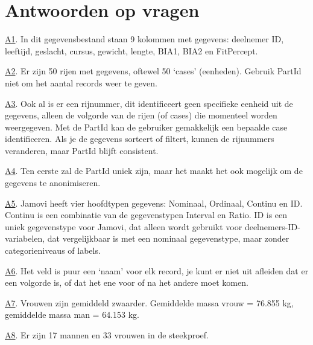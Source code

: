 \documentclass[
  letterpaper,
  DIV=11,
  numbers=noendperiod]{scrartcl}
\begin{document}
\hypertarget{antwoorden-op-vragen}{%
\section{Antwoorden op vragen}\label{antwoorden-op-vragen}}

\begin{tcolorbox}[beforeafter skip=1cm, ignore nobreak=true, breakable, colframe=Questions-frame, colback=Questions-bg, coltext=Questions-text, boxsep=2mm, arc=0mm, boxrule=0.5mm]

\protect\hypertarget{A1}{\protect\hyperlink{Q1}{A1}}. In dit
gegevensbestand staan 9 kolommen met gegevens: deelnemer ID, leeftijd,
geslacht, cursus, gewicht, lengte, BIA1, BIA2 en FitPercept.

\protect\hypertarget{A2}{\protect\hyperlink{Q2}{A2}}. Er zijn 50 rijen
met gegevens, oftewel 50 `cases' (eenheden). Gebruik PartId niet om het
aantal records weer te geven.

\protect\hypertarget{A3}{\protect\hyperlink{Q3}{A3}}. Ook al is er een
rijnummer, dit identificeert geen specifieke eenheid uit de gegevens,
alleen de volgorde van de rijen (of cases) die momenteel worden
weergegeven. Met de PartId kan de gebruiker gemakkelijk een bepaalde
case identificeren. Als je de gegevens sorteert of filtert, kunnen de
rijnummers veranderen, maar PartId blijft consistent.

\protect\hypertarget{A4}{\protect\hyperlink{Q4}{A4}}. Ten eerste zal de
PartId uniek zijn, maar het maakt het ook mogelijk om de gegevens te
anonimiseren.

\protect\hypertarget{A5}{\protect\hyperlink{Q5}{A5}}. Jamovi heeft vier
hoofdtypen gegevens: Nominaal, Ordinaal, Continu en ID. Continu is een
combinatie van de gegevenstypen Interval en Ratio. ID is een uniek
gegevenstype voor Jamovi, dat alleen wordt gebruikt voor
deelnemers-ID-variabelen, dat vergelijkbaar is met een nominaal
gegevenstype, maar zonder categorieniveaus of labels.

\protect\hypertarget{A6}{\protect\hyperlink{Q6}{A6}}. Het veld is puur
een `naam' voor elk record, je kunt er niet uit afleiden dat er een
volgorde is, of dat het ene voor of na het andere moet komen.

\protect\hypertarget{A7}{\protect\hyperlink{Q7}{A7}}. Vrouwen zijn
gemiddeld zwaarder. Gemiddelde massa vrouw = 76.855 kg, gemiddelde massa
man = 64.153 kg.

\protect\hypertarget{A8}{\protect\hyperlink{Q8}{A8}}. Er zijn 17 mannen
en 33 vrouwen in de steekproef.


\end{tcolorbox}
\end{document}

